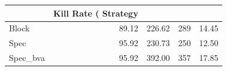 \begin{tabular}{lrrrr}
\toprule
 & Kill Rate (%
Strategy &  &  &  &  \\
\midrule
Block & 89.12 & 226.62 & 289 & 14.45 \\
Spec & 95.92 & 230.73 & 250 & 12.50 \\
Spec_bva & 95.92 & 392.00 & 357 & 17.85 \\
\bottomrule
\end{tabular}
